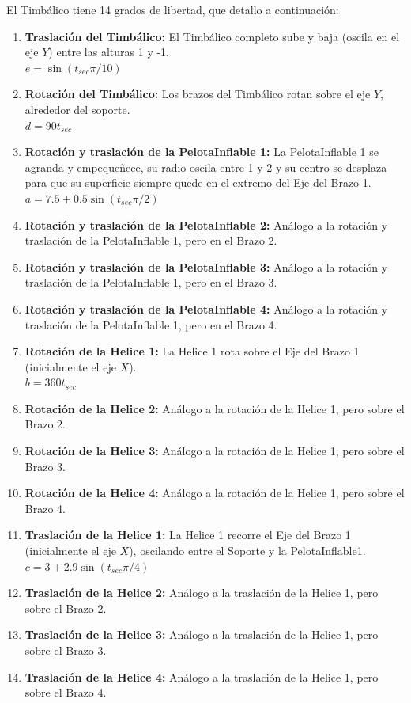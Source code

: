 \documentclass[12pt]{article}
\begin{document}
El Timbálico tiene 14 grados de libertad, que detallo a continuación:
\begin{enumerate}

\item \textbf{Traslación del Timbálico:}
  El Timbálico completo sube y baja (oscila en el eje $Y$) entre las alturas 1 y -1.
  \\ $e=\sin(t_{sec}\pi/10)$
\item \textbf{Rotación del Timbálico:}
  Los brazos del Timbálico rotan sobre el eje $Y$, alrededor del soporte. \\ $d=90t_{sec}$
\item \textbf{Rotación y traslación de la PelotaInflable 1:}
  La PelotaInflable 1 se agranda y empequeñece, su radio oscila entre 1 y 2 y su centro se desplaza para que su superficie siempre quede en el extremo del Eje del Brazo 1. \\ $a=7.5+0.5\sin(t_{sec}\pi/2)$
\item \textbf{Rotación y traslación de la PelotaInflable 2:}
  Análogo a la rotación y traslación de la PelotaInflable 1, pero en el Brazo 2.
\item \textbf{Rotación y traslación de la PelotaInflable 3:}
  Análogo a la rotación y traslación de la PelotaInflable 1, pero en el Brazo 3.
\item \textbf{Rotación y traslación de la PelotaInflable 4:}
  Análogo a la rotación y traslación de la PelotaInflable 1, pero en el Brazo 4.
\item \textbf{Rotación de la Helice 1:}
  La Helice 1 rota sobre el Eje del Brazo 1 (inicialmente el eje $X$).
  \\ $b=360t_{sec}$
\item \textbf{Rotación de la Helice 2:}
  Análogo a la rotación de la Helice 1, pero sobre el Brazo 2.
\item \textbf{Rotación de la Helice 3:}
  Análogo a la rotación de la Helice 1, pero sobre el Brazo 3.
\item \textbf{Rotación de la Helice 4:}
  Análogo a la rotación de la Helice 1, pero sobre el Brazo 4.
\item \textbf{Traslación de la Helice 1:} La Helice 1 recorre el Eje
  del Brazo 1 (inicialmente el eje $X$), oscilando entre el Soporte y
  la PelotaInflable1. \\ $c=3+2.9\sin(t_{sec}\pi/4)$
\item \textbf{Traslación de la Helice 2:}
  Análogo a la traslación de la Helice 1, pero sobre el Brazo 2.
\item \textbf{Traslación de la Helice 3:}
  Análogo a la traslación de la Helice 1, pero sobre el Brazo 3.
\item \textbf{Traslación de la Helice 4:}
  Análogo a la traslación de la Helice 1, pero sobre el Brazo 4.
\end{enumerate}
\end{document}
